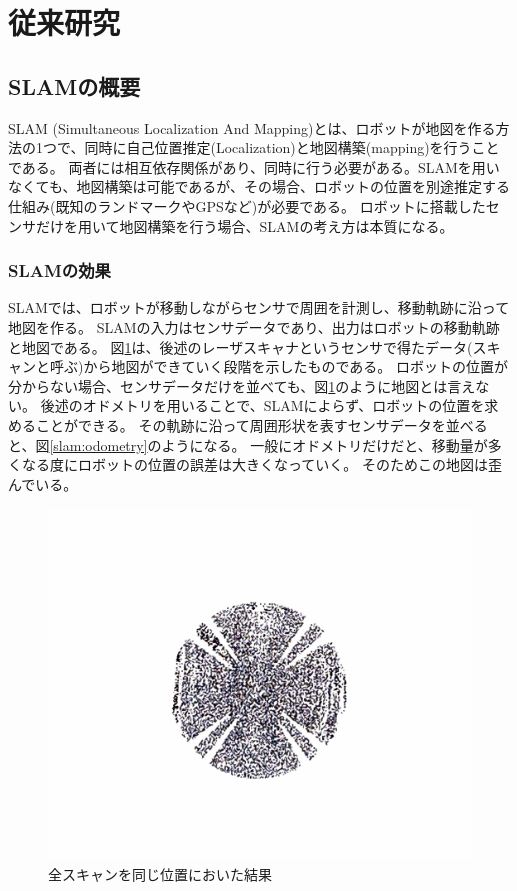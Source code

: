 \section{従来研究}
\subsection{SLAMの概要}
SLAM (Simultaneous Localization And Mapping)とは、ロボットが地図を作る方法の1つで、同時に自己位置推定(Localization)と地図構築(mapping)を行うことである。
両者には相互依存関係があり、同時に行う必要がある。SLAMを用いなくても、地図構築は可能であるが、その場合、ロボットの位置を別途推定する仕組み(既知のランドマークやGPSなど)が必要である。
ロボットに搭載したセンサだけを用いて地図構築を行う場合、SLAMの考え方は本質になる。

\subsubsection{SLAMの効果}
SLAMでは、ロボットが移動しながらセンサで周囲を計測し、移動軌跡に沿って地図を作る。
SLAMの入力はセンサデータであり、出力はロボットの移動軌跡と地図である。
図\ref{slam:scan}は、後述のレーザスキャナというセンサで得たデータ(スキャンと呼ぶ)から地図ができていく段階を示したものである。
ロボットの位置が分からない場合、センサデータだけを並べても、図\ref{slam:scan}のように地図とは言えない。
後述のオドメトリを用いることで、SLAMによらず、ロボットの位置を求めることができる。
その軌跡に沿って周囲形状を表すセンサデータを並べると、図\ref{slam:odometry}のようになる。
一般にオドメトリだけだと、移動量が多くなる度にロボットの位置の誤差は大きくなっていく。
そのためこの地図は歪んでいる。

\begin{figure}[h]
  \begin{center}
  \includegraphics[width=.8\linewidth]{img/slam_1.pdf}
  \caption{全スキャンを同じ位置においた結果\cite{slam:nyumon}}
  \label{slam:scan}
  \end{center}
\end{figure}

